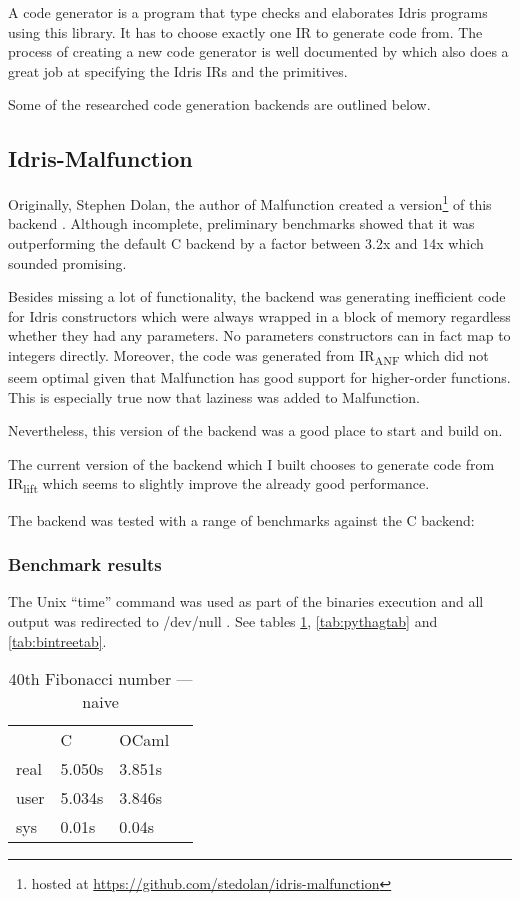 A code generator is a program that type checks and elaborates
Idris programs using this library.
It has to choose exactly one
IR to generate code from.
The process of creating a new code generator is well
documented by \citep{ElliottIdrisErlang} which also does a great job
at specifying the Idris IRs and the primitives.

Some of the researched code generation backends are outlined
below.

\subsection{Idris-Malfunction}

Originally, Stephen Dolan, the author of Malfunction created a
version\footnote{hosted at
    \url{https://github.com/stedolan/idris-malfunction}}
of this backend \citep{dolan2016malfunctional}.
Although incomplete, preliminary benchmarks showed that it was
outperforming the default C backend by a factor between 3.2x and 14x
which sounded promising.

Besides missing a lot of functionality, the backend was generating
inefficient code for Idris constructors which were always wrapped
in a block of memory regardless whether they had any parameters.
No parameters constructors can in fact map to integers directly.
Moreover, the code was generated from IR\textsubscript{ANF}
which did not seem optimal given that Malfunction has
good support for higher-order functions.
This is especially true now that laziness was added to Malfunction.

Nevertheless, this version of the backend was a good place to start
and build on.

The current version of the backend which I built chooses
to generate code from IR\textsubscript{lift} which seems to
slightly improve the already good performance.

The backend was tested with a range of benchmarks against the
C backend:

\subsubsection{Benchmark results}
The Unix ``time'' command was used as part of the binaries execution
and all output was redirected to /dev/null \citep{self}.
See tables \hyperref[tab:fibtab]{\ref{tab:fibtab}},
\hyperref[tab:pythagtab]{\ref{tab:pythagtab}} and
\hyperref[tab:bintreetab]{\ref{tab:bintreetab}}.

\begin{table}
    \centering
    \caption{40th Fibonacci number --- naive}
    \begin{tabular}{llll}\label{tab:fibtab}
             & C      & OCaml  & \\
        real & 5.050s & 3.851s & \\
        user & 5.034s & 3.846s & \\
        sys  & 0.01s  & 0.04s  &
    \end{tabular}
\end{table}

